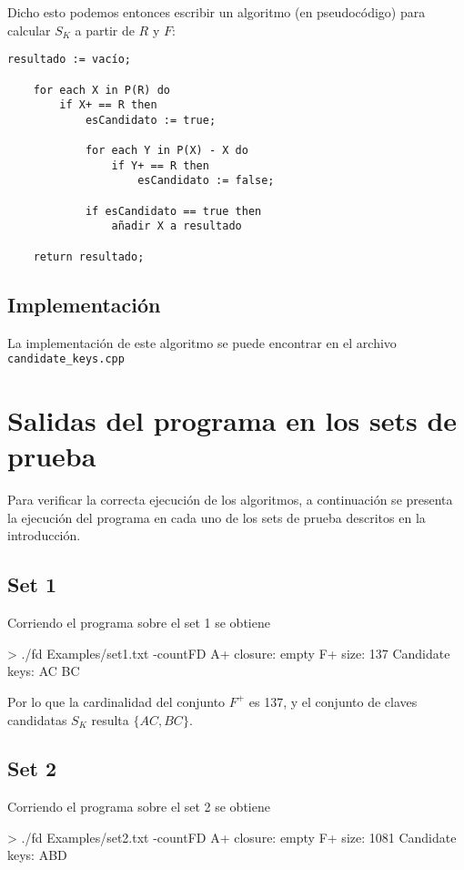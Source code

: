 \documentclass{article}
\begin{document}
Dicho esto podemos entonces escribir un algoritmo (en pseudocódigo) para calcular $S_{K}$ a partir de $R$ y $F$:

\begin{Verbatim}[frame=single]
    resultado := vacío;
    
    for each X in P(R) do
        if X+ == R then
            esCandidato := true;
            
            for each Y in P(X) - X do
                if Y+ == R then
                    esCandidato := false;
            
            if esCandidato == true then
                añadir X a resultado
                
    return resultado;
\end{Verbatim}

\subsection{Implementación}
La implementación de este algoritmo se puede encontrar en el archivo \verb|candidate_keys.cpp|


\newpage
\section{Salidas del programa en los sets de prueba}
Para verificar la correcta ejecución de los algoritmos, a continuación se presenta la ejecución del programa en cada uno de los sets de prueba descritos en la introducción.

\subsection{Set 1}
Corriendo el programa sobre el set 1 se obtiene

\begin{commandshell}
> ./fd Examples/set1.txt -countFD
A+ closure: empty
F+ size: 137
Candidate keys:
AC
BC
\end{commandshell}

Por lo que la cardinalidad del conjunto $F^{+}$ es 137, y el conjunto de claves candidatas $S_{K}$ resulta $\{AC,BC\}$.


\subsection{Set 2}
Corriendo el programa sobre el set 2 se obtiene

\begin{commandshell}
> ./fd Examples/set2.txt -countFD
A+ closure: empty
F+ size: 1081
Candidate keys:
ABD
\end{commandshell}
\end{document}
